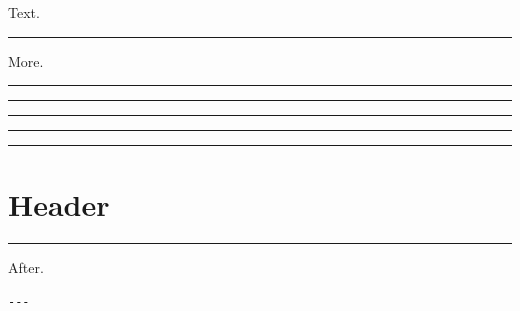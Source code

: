 Text.

\begin{center}\rule{0.5\linewidth}{0.5pt}\end{center}

More.

\begin{center}\rule{0.5\linewidth}{0.5pt}\end{center}

\begin{center}\rule{0.5\linewidth}{0.5pt}\end{center}

\begin{center}\rule{0.5\linewidth}{0.5pt}\end{center}

\begin{center}\rule{0.5\linewidth}{0.5pt}\end{center}

\begin{center}\rule{0.5\linewidth}{0.5pt}\end{center}

\section{Header}\label{header}

\begin{center}\rule{0.5\linewidth}{0.5pt}\end{center}

After.

\begin{verbatim}
---
\end{verbatim}
